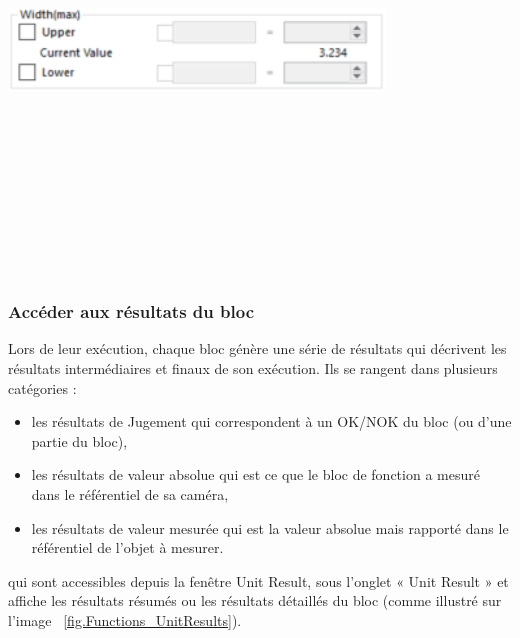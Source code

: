 \noindent
\begin{minipage}[c]{\textwidth}
  \centering
  \includegraphics[width=10cm, height=10cm, keepaspectratio]{addOns/LaboCalib_currentValue.png}
  \label{fig.Functions_CurrentValue}
\end{minipage}\\
\vspace{0.3cm}


\subsubsection{Accéder aux résultats du bloc}
\label{Sec.Functions_UnitResults}
Lors de leur exécution, chaque bloc génère une série de résultats qui décrivent les résultats intermédiaires et finaux de son exécution. Ils se rangent dans plusieurs catégories :
\begin{itemize}
  \item les résultats de Jugement qui correspondent à un OK/NOK du bloc (ou d’une
  partie du bloc),
  \item les résultats de valeur absolue qui est ce que le bloc de fonction a mesuré
  dans le référentiel de sa caméra,
  \item les résultats de valeur mesurée qui est la valeur absolue mais rapporté dans 
  le référentiel de l’objet à mesurer.
\end{itemize}
\noindent qui sont accessibles depuis la fenêtre Unit Result, sous l’onglet « Unit Result » et affiche les résultats résumés ou les résultats détaillés du bloc (comme illustré sur l’image ~\ref{fig.Functions_UnitResults}).

